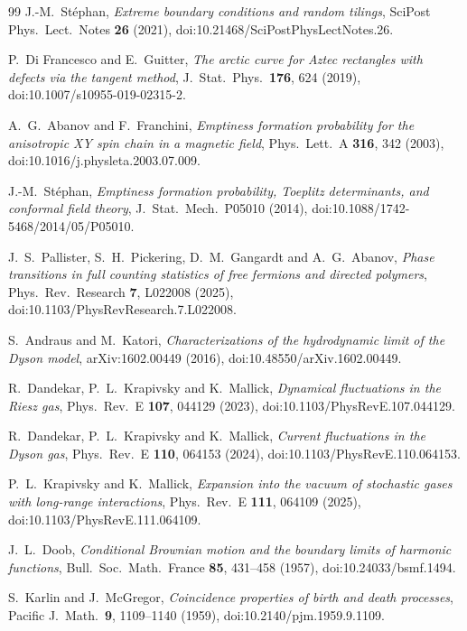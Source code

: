 \documentclass[11pt]{article}
\numberwithin{equation}{section}
\newcommand{\1}{\mathbf 1}
\begin{document}
\begin{thebibliography}{99}
J.-M.~St\'ephan,
\emph{Extreme boundary conditions and random tilings},
SciPost Phys.~Lect.~Notes \textbf{26} (2021),
doi:10.21468/SciPostPhysLectNotes.26.

P.~Di Francesco and E.~Guitter,
\emph{The arctic curve for Aztec rectangles with defects via the tangent
method},
J.~Stat.~Phys.~\textbf{176}, 624 (2019),
doi:10.1007/s10955-019-02315-2.

A.~G.~Abanov and F.~Franchini,
\emph{Emptiness formation probability for the anisotropic XY spin chain in a
magnetic field},
Phys.~Lett.~A \textbf{316}, 342 (2003),
doi:10.1016/j.physleta.2003.07.009.

J.-M.~St\'ephan,
\emph{Emptiness formation probability, Toeplitz determinants, and conformal
field theory},
J.~Stat.~Mech.~P05010 (2014),
doi:10.1088/1742-5468/2014/05/P05010.

J.~S.~Pallister, S.~H.~Pickering, D.~M.~Gangardt and A.~G.~Abanov,
\emph{Phase transitions in full counting statistics of free fermions and
directed polymers},
Phys.~Rev.~Research \textbf{7}, L022008 (2025),
doi:10.1103/PhysRevResearch.7.L022008.

S.~Andraus and M.~Katori,
\emph{Characterizations of the hydrodynamic limit of the Dyson model},
arXiv:1602.00449 (2016),
doi:10.48550/arXiv.1602.00449.

R.~Dandekar, P.~L.~Krapivsky and K.~Mallick,
\emph{Dynamical fluctuations in the Riesz gas},
Phys.~Rev.~E \textbf{107}, 044129 (2023),
doi:10.1103/PhysRevE.107.044129.

R.~Dandekar, P.~L.~Krapivsky and K.~Mallick,
\emph{Current fluctuations in the Dyson gas},
Phys.~Rev.~E \textbf{110}, 064153 (2024),
doi:10.1103/PhysRevE.110.064153.

P.~L.~Krapivsky and K.~Mallick,
\emph{Expansion into the vacuum of stochastic gases with long-range
interactions},
Phys.~Rev.~E \textbf{111}, 064109 (2025),
doi:10.1103/PhysRevE.111.064109.


J.~L.~Doob,
\emph{Conditional Brownian motion and the boundary limits of harmonic
functions},
Bull.~Soc.~Math.~France \textbf{85}, 431--458 (1957),
doi:10.24033/bsmf.1494.

S.~Karlin and J.~McGregor,
\emph{Coincidence properties of birth and death processes},
Pacific J.~Math.~\textbf{9}, 1109--1140 (1959),
doi:10.2140/pjm.1959.9.1109.


\end{thebibliography}
\end{document}

